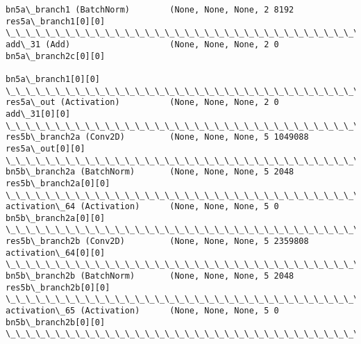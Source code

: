 \documentclass[11pt]{article}
\begin{document}
\begin{Verbatim}[commandchars=\\\{\}]
bn5a\_branch1 (BatchNorm)        (None, None, None, 2 8192        res5a\_branch1[0][0]              
\_\_\_\_\_\_\_\_\_\_\_\_\_\_\_\_\_\_\_\_\_\_\_\_\_\_\_\_\_\_\_\_\_\_\_\_\_\_\_\_\_\_\_\_\_\_\_\_\_\_\_\_\_\_\_\_\_\_\_\_\_\_\_\_\_\_\_\_\_\_\_\_\_\_\_\_\_\_\_\_\_\_\_\_\_\_\_\_\_\_\_\_\_\_\_\_\_\_
add\_31 (Add)                    (None, None, None, 2 0           bn5a\_branch2c[0][0]              
                                                                 bn5a\_branch1[0][0]               
\_\_\_\_\_\_\_\_\_\_\_\_\_\_\_\_\_\_\_\_\_\_\_\_\_\_\_\_\_\_\_\_\_\_\_\_\_\_\_\_\_\_\_\_\_\_\_\_\_\_\_\_\_\_\_\_\_\_\_\_\_\_\_\_\_\_\_\_\_\_\_\_\_\_\_\_\_\_\_\_\_\_\_\_\_\_\_\_\_\_\_\_\_\_\_\_\_\_
res5a\_out (Activation)          (None, None, None, 2 0           add\_31[0][0]                     
\_\_\_\_\_\_\_\_\_\_\_\_\_\_\_\_\_\_\_\_\_\_\_\_\_\_\_\_\_\_\_\_\_\_\_\_\_\_\_\_\_\_\_\_\_\_\_\_\_\_\_\_\_\_\_\_\_\_\_\_\_\_\_\_\_\_\_\_\_\_\_\_\_\_\_\_\_\_\_\_\_\_\_\_\_\_\_\_\_\_\_\_\_\_\_\_\_\_
res5b\_branch2a (Conv2D)         (None, None, None, 5 1049088     res5a\_out[0][0]                  
\_\_\_\_\_\_\_\_\_\_\_\_\_\_\_\_\_\_\_\_\_\_\_\_\_\_\_\_\_\_\_\_\_\_\_\_\_\_\_\_\_\_\_\_\_\_\_\_\_\_\_\_\_\_\_\_\_\_\_\_\_\_\_\_\_\_\_\_\_\_\_\_\_\_\_\_\_\_\_\_\_\_\_\_\_\_\_\_\_\_\_\_\_\_\_\_\_\_
bn5b\_branch2a (BatchNorm)       (None, None, None, 5 2048        res5b\_branch2a[0][0]             
\_\_\_\_\_\_\_\_\_\_\_\_\_\_\_\_\_\_\_\_\_\_\_\_\_\_\_\_\_\_\_\_\_\_\_\_\_\_\_\_\_\_\_\_\_\_\_\_\_\_\_\_\_\_\_\_\_\_\_\_\_\_\_\_\_\_\_\_\_\_\_\_\_\_\_\_\_\_\_\_\_\_\_\_\_\_\_\_\_\_\_\_\_\_\_\_\_\_
activation\_64 (Activation)      (None, None, None, 5 0           bn5b\_branch2a[0][0]              
\_\_\_\_\_\_\_\_\_\_\_\_\_\_\_\_\_\_\_\_\_\_\_\_\_\_\_\_\_\_\_\_\_\_\_\_\_\_\_\_\_\_\_\_\_\_\_\_\_\_\_\_\_\_\_\_\_\_\_\_\_\_\_\_\_\_\_\_\_\_\_\_\_\_\_\_\_\_\_\_\_\_\_\_\_\_\_\_\_\_\_\_\_\_\_\_\_\_
res5b\_branch2b (Conv2D)         (None, None, None, 5 2359808     activation\_64[0][0]              
\_\_\_\_\_\_\_\_\_\_\_\_\_\_\_\_\_\_\_\_\_\_\_\_\_\_\_\_\_\_\_\_\_\_\_\_\_\_\_\_\_\_\_\_\_\_\_\_\_\_\_\_\_\_\_\_\_\_\_\_\_\_\_\_\_\_\_\_\_\_\_\_\_\_\_\_\_\_\_\_\_\_\_\_\_\_\_\_\_\_\_\_\_\_\_\_\_\_
bn5b\_branch2b (BatchNorm)       (None, None, None, 5 2048        res5b\_branch2b[0][0]             
\_\_\_\_\_\_\_\_\_\_\_\_\_\_\_\_\_\_\_\_\_\_\_\_\_\_\_\_\_\_\_\_\_\_\_\_\_\_\_\_\_\_\_\_\_\_\_\_\_\_\_\_\_\_\_\_\_\_\_\_\_\_\_\_\_\_\_\_\_\_\_\_\_\_\_\_\_\_\_\_\_\_\_\_\_\_\_\_\_\_\_\_\_\_\_\_\_\_
activation\_65 (Activation)      (None, None, None, 5 0           bn5b\_branch2b[0][0]              
\_\_\_\_\_\_\_\_\_\_\_\_\_\_\_\_\_\_\_\_\_\_\_\_\_\_\_\_\_\_\_\_\_\_\_\_\_\_\_\_\_\_\_\_\_\_\_\_\_\_\_\_\_\_\_\_\_\_\_\_\_\_\_\_\_\_\_\_\_\_\_\_\_\_\_\_\_\_\_\_\_\_\_\_\_\_\_\_\_\_\_\_\_\_\_\_\_\_

\end{Verbatim}
\end{document}
